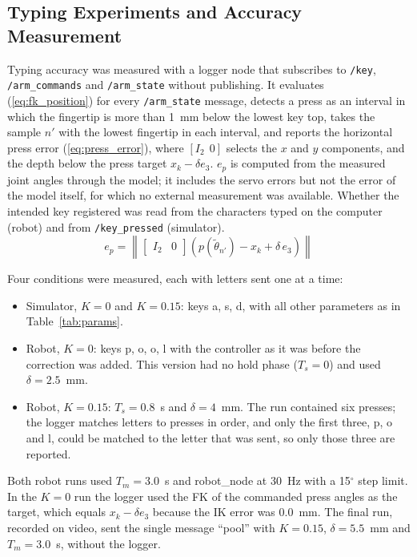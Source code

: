 \documentclass[letterpaper, 10 pt, conference]{ieeeconf}
\begin{document}
\subsection{Typing Experiments and Accuracy Measurement}
\label{sec:typing_exp}
Typing accuracy was measured with a logger node that subscribes to \texttt{/key}, \texttt{/arm\_commands} and
\texttt{/arm\_state} without publishing. It evaluates (\ref{eq:fk_position}) for every \texttt{/arm\_state}
message, detects a press as an interval in which the fingertip is more than 1~mm below the lowest key top,
takes the sample $n'$ with the lowest fingertip in each interval, and reports the horizontal press error
(\ref{eq:press_error}), where $[I_2\;\,0]$ selects the $x$ and $y$ components, and the depth below the press
target $x_k - \delta e_3$. $e_p$ is computed from the measured joint angles through the model; it includes the
servo errors but not the error of the model itself, for which no external measurement was available. Whether
the intended key registered was read from the characters typed on the computer (robot) and from
\texttt{/key\_pressed} (simulator).
\begin{equation}
e_{p} = \left\lVert \begin{bmatrix} I_2 & 0 \end{bmatrix}
\left( p(\tilde{\theta}_{n'}) - x_k + \delta\,e_3 \right) \right\rVert
\label{eq:press_error}
\end{equation}

Four conditions were measured, each with letters sent one at a time:
\begin{itemize}
\item Simulator, $K = 0$ and $K = 0.15$: keys a, s, d, with all other parameters as in Table~\ref{tab:params}.
\item Robot, $K = 0$: keys p, o, o, l with the controller as it was before the correction was added. This
version had no hold phase ($T_s = 0$) and used $\delta = 2.5$~mm.
\item Robot, $K = 0.15$: $T_s = 0.8$~s and $\delta = 4$~mm. The run contained six presses; the logger
matches letters to presses in order, and only the first three, p, o and l, could be matched to the letter
that was sent, so only those three are reported.
\end{itemize}
Both robot runs used $T_m = 3.0$~s and robot\_node at 30~Hz with a 15$^\circ$ step limit. In the $K = 0$ run
the logger used the FK of the commanded press angles as the target, which equals $x_k - \delta e_3$ because the
IK error was 0.0~mm. The final run, recorded
on video, sent the single message ``pool'' with $K = 0.15$, $\delta = 5.5$~mm and $T_m = 3.0$~s, without the
logger.
\end{document}

